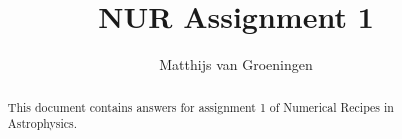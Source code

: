 \documentclass[a4paper,10pt]{article}
\title{NUR Assignment 1}
\author{Matthijs van Groeningen}
\begin{document}
\maketitle

\begin{abstract}
This document contains answers for assignment 1 of Numerical Recipes in Astrophysics. 
\end{abstract}





\newpage


\end{document}
